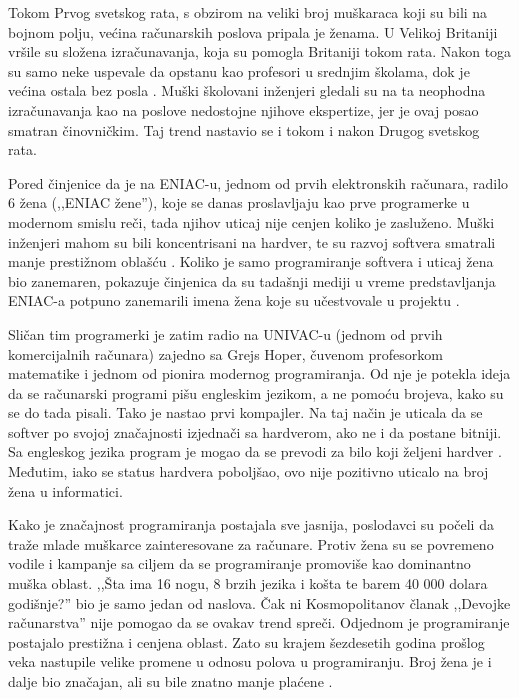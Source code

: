 {\sloppy
Tokom Prvog svetskog rata, s obzirom na veliki broj mu\-ška\-raca koji su bili na bojnom polju, većina računarskih poslova pripala je ženama. U Velikoj Britaniji vršile su složena izračunavanja, koja su pomogla Britaniji tokom rata. Nakon toga su samo neke uspevale da opstanu kao profesori u srednjim školama, dok je većina ostala bez posla \cite{grier}. Muški školovani inženjeri gledali su na ta neophodna izračunavanja kao na poslove nedostojne njihove ekspertize, jer je ovaj posao smatran činovničkim. Taj trend nastavio se i tokom i nakon Drugog svetskog rata.}

Pored činjenice da je na ENIAC-u, jednom od prvih elektronskih raču\-nara, radilo 6 žena (,,ENIAC žene''), koje se danas proslavljaju kao prve programerke u modernom smislu reči, tada njihov uticaj nije cenjen koliko je zasluženo. Muški inženjeri mahom su bili koncentrisani na hardver, te su razvoj softvera smatrali manje prestižnom oblašću \cite{frink}. Koliko je samo programiranje softvera i uticaj žena bio zanemaren, pokazuje činjenica da su tadašnji mediji u vreme predstavljanja ENIAC-a potpuno zanemarili imena žena koje su učestvovale u projektu \cite{npr}.

Sličan tim programerki je zatim radio na UNIVAC-u (jednom od prvih komercijalnih računara) zajedno sa Grejs Hoper, čuvenom profesorkom matematike i jednom od pionira modernog programiranja. Od nje je potekla ideja da se računarski programi pišu engleskim jezikom, a ne pomoću brojeva, kako su se do tada pisali. Tako je nastao prvi kompajler. Na taj način je uticala da se softver po svojoj značajnosti izjednači sa hardverom, ako ne i da postane bitniji. Sa engleskog jezika program je mogao da se prevodi za bilo koji željeni hardver \cite{npr}. Međutim, iako se status hardvera poboljšao, ovo nije pozitivno uticalo na broj žena u informatici.

Kako je značajnost programiranja postajala sve jasnija, poslodavci su počeli da traže mlade muškarce zainteresovane za računare. Protiv žena su se povremeno vodile i kampanje sa ciljem da se programiranje promoviše kao dominantno muška oblast. ,,Šta ima 16 nogu, 8 brzih jezika i košta te barem 40 000 dolara godišnje?'' bio je samo jedan od naslova. Čak ni Kosmopolitanov članak ,,Devojke računarstva'' nije pomogao da se ovakav trend spreči. Odjednom je programiranje postajalo prestižna i cenjena oblast. Zato su krajem šezdesetih godina prošlog veka nastupile velike promene u odnosu polova u programiranju. Broj žena je i dalje bio značajan, ali su bile znatno manje plaćene \cite{evans, frink}.

